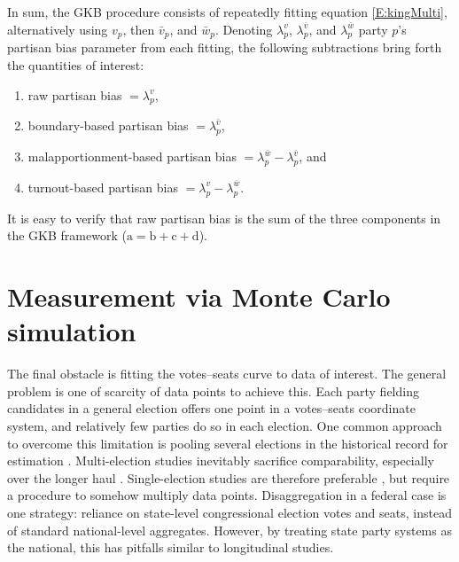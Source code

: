 \documentclass[letter,12pt]{article}
\begin{document}
In sum, the GKB procedure consists of repeatedly fitting equation \ref{E:kingMulti}, alternatively using $v_p$, then $\bar{v}_p$, and $\bar{w}_p$. Denoting $\lambda_p^v$, $\lambda_p^{\bar{v}}$, and $\lambda_p^{\bar{w}}$ party $p$'s partisan bias parameter from each fitting, the following subtractions bring forth the quantities of interest: 

\begin{enumerate}
\renewcommand{\theenumi}{\alph{enumi}}
\item raw partisan bias $=\lambda_p^v$,
\item boundary-based partisan bias $=\lambda_p^{\bar{v}}$, 
\item malapportionment-based partisan bias $=\lambda_p^{\bar{w}}-\lambda_p^{\bar{v}}$, and
\item turnout-based partisan bias $=\lambda_p^v-\lambda_p^{\bar{w}}$.
\end{enumerate}

\noindent It is easy to verify that raw partisan bias is the sum of the three components in the GKB framework ($\text{a}=\text{b}+\text{c}+\text{d}$). 

\section{Measurement via Monte Carlo simulation}

The final obstacle is fitting the votes--seats curve to data of interest. The general problem is one of scarcity of data points to achieve this. Each party fielding candidates in a general election offers one point in a votes--seats coordinate system, and relatively few parties do so in each election. One common approach to overcome this limitation is pooling several elections in the historical record for estimation \citep[e.g.,][]{marquez2014biasBlog}. Multi-election studies inevitably sacrifice comparability, especially over the longer haul \citep{jackmanMeasuringBias1994}. Single-election studies are therefore preferable \citep{niemi.fett1986swing}, but require a procedure to somehow multiply data points. Disaggregation in a federal case is one strategy: reliance on state-level congressional election votes and seats, instead of standard national-level aggregates. However, by treating state party systems as the national, this has pitfalls similar to longitudinal studies.
\end{document}
